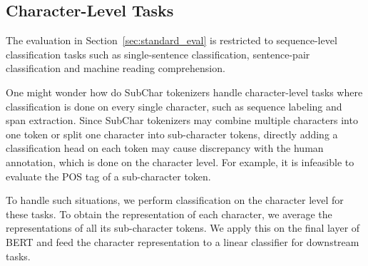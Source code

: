 \subsection{Character-Level Tasks}


The evaluation in Section~\ref{sec:standard_eval} is restricted to sequence-level classification tasks such as single-sentence classification, sentence-pair classification and machine reading comprehension. 

One might wonder how do SubChar tokenizers handle character-level tasks where classification is done on every single character, such as sequence labeling and span extraction. Since SubChar tokenizers may combine multiple characters into one token or split one character into sub-character tokens, directly adding a classification head on each token may cause discrepancy with the human annotation, which is done on the character level. For example, it is infeasible to evaluate the POS tag of a sub-character token.




To handle such situations, we perform classification on the character level for these tasks.
To obtain the representation of each character, we average the representations of all its sub-character tokens. We apply this on the final layer of BERT and feed the character representation to a linear classifier for downstream tasks.


